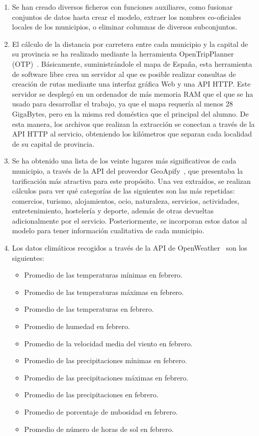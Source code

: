 \begin{enumerate}
    \item Se han creado diversos ficheros con funciones auxiliares, como fusionar conjuntos de datos hasta crear el modelo, extraer los nombres co-oficiales locales de los municipios, o eliminar columnas de diversos subconjuntos.
    \item El cálculo de la distancia por carretera entre cada municipio y la capital de su provincia se ha realizado mediante la herramienta OpenTripPlanner (OTP)~\cite{otp}. Básicamente, suministrándole el mapa de España, esta herramienta de software libre crea un servidor al que es posible realizar consultas de creación de rutas mediante una interfaz gráfica Web y una API HTTP. Este servidor se desplegó en un ordenador de más memoria RAM que el que se ha usado para desarrollar el trabajo, ya que el mapa requería al menos 28 GigaBytes, pero en la misma red doméstica que el principal del alumno. De esta manera, los archivos que realizan la extracción se conectan a través de la API HTTP al servicio, obteniendo los kilómetros que separan cada localidad de su capital de provincia.
    \item Se ha obtenido una lista de los veinte lugares más significativos de cada municipio, a través de la API del proveedor GeoApify~\cite{geoapify}, que presentaba la tarificación más atractiva para este propósito. Una vez extraídos, se realizan cálculos para ver qué categorías de las siguientes son las más repetidas: comercios, turismo, alojamientos, ocio, naturaleza, servicios, actividades, entretenimiento, hostelería y deporte, además de otras devueltas adicionalmente por el servicio. Posteriormente, se incorporan estos datos al modelo para tener información cualitativa de cada municipio.
    \item Los datos climáticos recogidos a través de la API de OpenWeather~\cite{openweather} son los siguientes:

    \begin{itemize}
        \item Promedio de las temperaturas mínimas en febrero.
        \item Promedio de las temperaturas máximas en febrero.
        \item Promedio de las temperaturas en febrero.
        \item Promedio de humedad en febrero.
        \item Promedio de la velocidad media del viento en febrero.
        \item Promedio de las precipitaciones mínimas en febrero.
        \item Promedio de las precipitaciones máximas en febrero.
        \item Promedio de las precipitaciones en febrero.
        \item Promedio de porcentaje de nubosidad en febrero.
        \item Promedio de número de horas de sol en febrero.
    

\end{itemize}
\end{enumerate}
